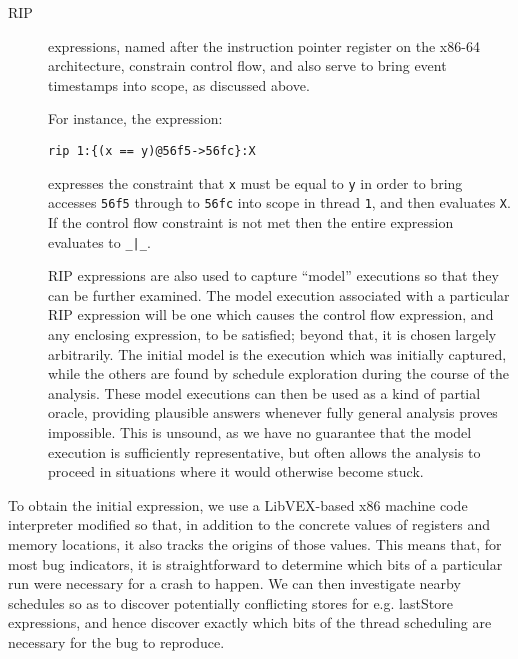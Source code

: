\documentclass[10pt,a4paper]{report}
\begin{document}
\begin{description}
\item[RIP] expressions, named after the instruction pointer register
  on the x86-64 architecture, constrain control flow, and also serve
  to bring event timestamps into scope, as discussed above.

  For instance, the expression:

\begin{verbatim}
rip 1:{(x == y)@56f5->56fc}:X
\end{verbatim}

  expresses the constraint that \verb|x| must be equal to \verb|y| in
  order to bring accesses \verb|56f5| through to \verb|56fc| into
  scope in thread \verb|1|, and then evaluates \verb|X|.  If the
  control flow constraint is not met then the entire expression
  evaluates to \verb^_|_^.

  RIP expressions are also used to capture ``model'' executions so
  that they can be further examined.  The model execution associated
  with a particular RIP expression will be one which causes the
  control flow expression, and any enclosing expression, to be
  satisfied; beyond that, it is chosen largely arbitrarily.  The
  initial model is the execution which was initially captured, while
  the others are found by schedule exploration during the course of
  the analysis.  These model executions can then be used as a kind of
  partial oracle, providing plausible answers whenever fully general
  analysis proves impossible.  This is unsound, as we have no
  guarantee that the model execution is sufficiently representative,
  but often allows the analysis to proceed in situations where it
  would otherwise become stuck.

\end{description}

To obtain the initial expression, we use a LibVEX\needCite{}-based x86 machine
code interpreter modified so that, in addition to the concrete values
of registers and memory locations, it also tracks the origins of those
values.  This means that, for most bug
indicators, it is straightforward to determine which bits of a
particular run were necessary for a crash to happen.  We can then
investigate nearby schedules so as to discover potentially conflicting
stores for e.g. lastStore expressions, and hence discover exactly
which bits of the thread scheduling are necessary for the bug to
reproduce.
\end{document}
